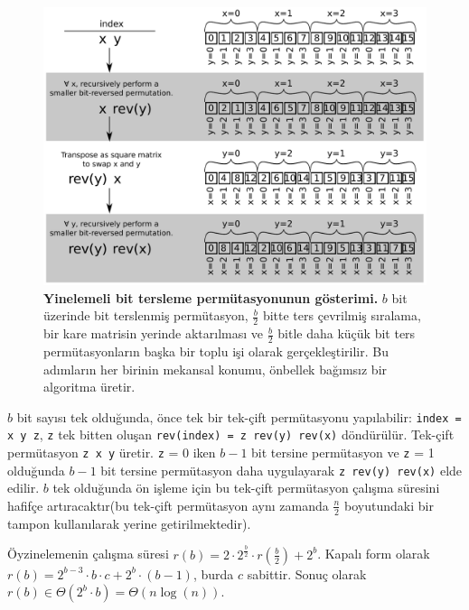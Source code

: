 \documentclass[10pt]{article}
\begin{document}
\begin{figure}
\centering
\includegraphics[width=5in]{cartoons/recursive.pdf}
\caption{{\bf Yinelemeli bit tersleme perm\"{u}tasyonunun g\"{o}sterimi.} 
$b$ bit \"{u}zerinde bit terslenmi\c{s} perm\"{u}tasyon, $\frac{b}{2}$ bitte ters \c{c}evrilmi\c{s} s{\i}ralama,
bir kare matrisin yerinde aktar{\i}lmas{\i} ve $\frac{b}{2}$ bitle daha k\"{u}\c{c}\"{u}k bit 
ters perm\"{u}tasyonlar{\i}n ba\c{s}ka bir toplu i\c{s}i olarak ger\c{c}ekle\c{s}tirilir.
Bu ad{\i}mlar{\i}n her birinin mekansal konumu, \"{o}nbellek ba\u{g}{\i}ms{\i}z bir algoritma \"{u}retir.
\label{figure:recursive}}
\end{figure}

$b$ bit say{\i}s{\i} tek oldu\u{g}unda, \"{o}nce tek bir tek-\c{c}ift perm\"{u}tasyonu yap{\i}labilir: 
{\tt index = x~y~z}, {\tt z} tek bitten olu\c{s}an 
{\tt rev(index) = z~rev(y)~rev(x)} d\"{o}nd\"{u}r\"{u}l\"{u}r. Tek-\c{c}ift perm\"{u}tasyon {\tt z~x~y} \"{u}retir.
{\tt z} = 0 iken $b-1$ bit tersine perm\"{u}tasyon ve {\tt z} = 1 oldu\u{g}unda $b-1$ 
bit tersine perm\"{u}tasyon daha uygulayarak {\tt z~rev(y)~rev(x)} elde edilir.
$b$ tek oldu\u{g}unda \"{o}n i\c{s}leme i\c{c}in bu tek-\c{c}ift perm\"{u}tasyon \c{c}al{\i}\c{s}ma s\"{u}resini 
hafif\c{c}e art{\i}racakt{\i}r(bu tek-\c{c}ift perm\"{u}tasyon ayn{\i} zamanda $\frac{n}{2}$ 
boyutundaki bir tampon kullan{\i}larak yerine getirilmektedir).

\"{O}yzinelemenin \c{c}al{\i}\c{s}ma s\"{u}resi $r(b)
= 2 \cdot 2^{\frac{b}{2}} \cdot r(\frac{b}{2}) + 2^b$. Kapal{\i} form olarak
$r(b) = 2^{b-3} \cdot b \cdot c + 2^b \cdot (b-1)$,
burda $c$ sabittir. Sonu\c{c} olarak $r(b) \in \Theta(2^b \cdot b) = \Theta(n
\log(n))$.
\end{document}
